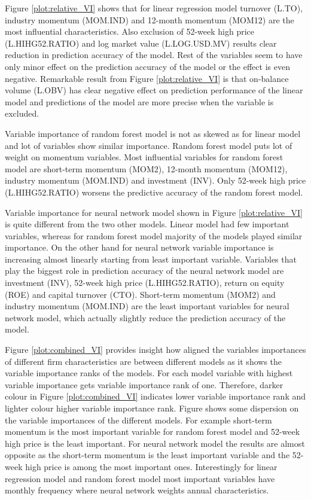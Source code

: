 \documentclass{article}
\begin{document}
Figure \ref{plot:relative_VI} shows that for linear regression model turnover (L.TO), industry momentum (MOM.IND) and 12-month momentum (MOM12) are the most influential characteristics. Also exclusion of 52-week high price (L.HIHG52.RATIO) and log market value (L.LOG.USD.MV) results clear reduction in prediction accuracy of the model. Rest of the variables seem to have only minor effect on the prediction accuracy of the model or the effect is even negative. Remarkable result from Figure \ref{plot:relative_VI} is that on-balance volume (L.OBV) has clear negative effect on prediction performance of the linear model and predictions of the model are more precise when the variable is excluded. \par

Variable importance of random forest model is not as skewed as for linear model and lot of variables show similar importance. Random forest model puts lot of weight on momentum variables. Most influential variables for random forest model are short-term momentum (MOM2), 12-month momentum (MOM12), industry momentum (MOM.IND) and investment (INV). Only 52-week high price (L.HIHG52.RATIO) worsens the predictive accuracy of the random forest model. \par

Variable importance for neural network model shown in Figure \ref{plot:relative_VI} is quite different from the two other models. Linear model had few important variables, whereas for random forest model majority of the models played similar importance. On the other hand for neural network variable importance is increasing almost linearly starting from least important variable. Variables that play the biggest role in prediction accuracy of the neural network model are investment (INV), 52-week high price (L.HIHG52.RATIO), return on equity (ROE) and capital turnover (CTO). Short-term momentum (MOM2) and industry momentum (MOM.IND) are the least important variables for neural network model, which actually slightly reduce the prediction accuracy of the model. \par 

Figure \ref{plot:combined_VI} provides insight how aligned the variables importances of different firm characteristics are between different models as it shows the variable importance ranks of the models. For each model variable with highest variable importance gets variable importance rank of one. Therefore, darker colour in Figure \ref{plot:combined_VI} indicates lower variable importance rank and lighter colour higher variable importance rank. Figure shows some dispersion on the variable importances of the different models. For example short-term momentum is the most important variable for random forest model and 52-week high price is the least important. For neural network model the results are almost opposite as the short-term momentum is the least important variable and the 52-week high price is among the most important ones. Interestingly for linear regression model and random forest model most important variables have monthly frequency where neural network weights annual characteristics. \par
\end{document}

